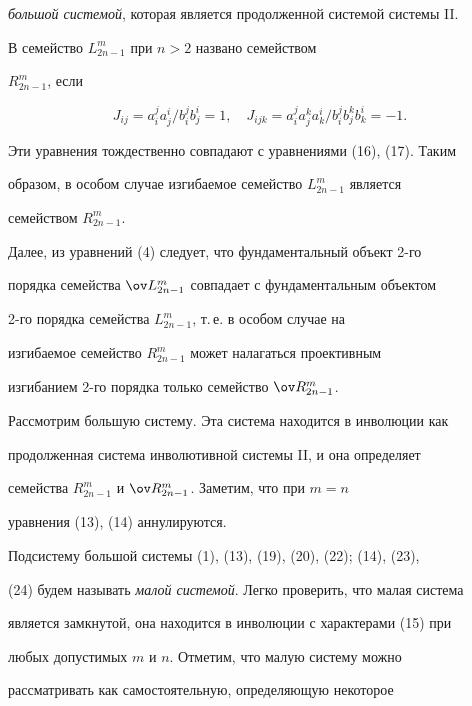 {\it большой системой}, которая является продолженной системой системы II. 


 


В \cite{6} семейство $L^m_{2n-1}$ при $n>2$ названо семейством 


$R^m_{2n-1}$, если 


$$ 


J_{ij}=a^j_i a^i_j/b^j_i b^i_j=1,\quad 


J_{ijk}=a^j_i a^k_j a^i_k/b^j_i b^k_j b^i_k=-1. 


$$ 


Эти уравнения тождественно совпадают с уравнениями (16), (17). Таким 


образом, в особом случае изгибаемое семейство $L^m_{2n-1}$ является 


семейством $R^m_{2n-1}$. 


 


Далее, из уравнений (4) следует, что фундаментальный объект 2-го 


порядка семейства $\ov L^m_{2n-1}$ совпадает с фундаментальным объектом 


2-го порядка семейства $L^m_{2n-1}$, т.\,е. в особом случае на 


изгибаемое семейство $R^m_{2n-1}$ может налагаться проективным 


изгибанием 2-го порядка только семейство $\ov R^m_{2n-1}$. 


 


Рассмотрим большую систему. Эта система находится в инволюции как 


продолженная система инволютивной системы II, и она определяет 


семейства $R^m_{2n-1}$ и $\ov R^m_{2n-1}$. Заметим, что при $m=n$ 


уравнения (13), (14) аннулируются. 


 


Подсистему большой системы (1), (13), (19), (20), (22); (14), (23), 


(24) будем называть {\it малой системой}. Легко проверить, что малая система 


является замкнутой, она находится в инволюции с характерами (15) при 


любых допустимых $m$ и $n$. Отметим, что малую систему можно 


рассматривать как самостоятельную, определяющую некоторое


